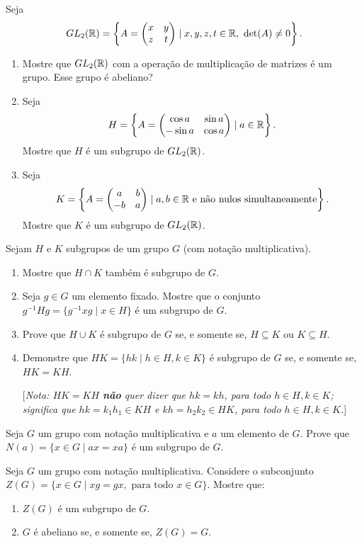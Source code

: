 \documentclass[12pt]{exam}
\begin{document}
    \questao{} Seja
    \[
      GL_2(\mathbb{R}) = \left\{A = \begin{pmatrix}
          x & y\\z & t
      \end{pmatrix} \mid x, y, z, t \in \mathbb{R},\ \det(A) \ne 0\right\}.
    \]
    \begin{enumerate}[label=({\alph*})]
      \item Mostre que $GL_2(\mathbb{R})$ com a opera\c{c}\~ao de multiplica\c{c}\~ao de matrizes \'e um grupo. Esse grupo \'e abeliano?
      \item Seja
      \[
          H = \left\{ A = \begin{pmatrix}
              \cos a & \sin a\\ -\sin a & \cos a
          \end{pmatrix} \mid a \in \mathbb{R}\right\}.
      \]
      Mostre que $H$ \'e um subgrupo de $GL_2(\mathbb{R})$.
      \item Seja
      \[
          K = \left\{ A = \begin{pmatrix}
              a & b\\ -b & a
          \end{pmatrix} \mid a, b \in \mathbb{R} \mbox{ e n\~ao nulos simultaneamente}\right\}.
      \]
      Mostre que $K$ \'e um subgrupo de $GL_2(\mathbb{R})$.
    \end{enumerate}

    \questao{} Sejam $H$ e $K$ subgrupos de um grupo $G$ (com nota{\c c}{\~a}o
    multiplicativa).
    \begin{enumerate}[label=({\alph*})]
    \item Mostre que $H\cap K$ tamb{\'e}m {\'e} subgrupo de $G$.
    \item Seja $g\in G$ um elemento fixado. Mostre que o conjunto
    $g^{-1}Hg=\{ g^{-1}xg \mid x\in H \} $ {\'e} um subgrupo de $G$.
    \item Prove que $H\cup K$ {\'e} subgrupo de $G$ se, e somente se,
    $H\subseteq K$ ou $K\subseteq H$.
    \item Demonstre que $HK=\{hk \mid h\in H, k\in K\}$ {\'e} subgrupo
    de $G$ se, e somente se, $HK=KH$.

    [\emph{Nota: $HK=KH$ \textbf{n{\~a}o} quer dizer que $hk=kh$,
    para todo $h\in H, k\in K$; significa que $hk=k_1h_1 \in KH$ e $kh=h_2k_2 \in
    HK$, para todo $h\in H, k\in K$.}]
    \end{enumerate}

    \vspace{.3cm}
    \questao{} Seja $G$ um grupo com nota\c{c}\~ao multiplicativa e $a$ um elemento de $G$. Prove que $N(a) = \{x \in G \mid ax = xa\}$ \'e um subgrupo de $G$.

    \vspace{.3cm}

    \questao{} Seja $G$ um grupo com nota\c{c}\~ao multiplicativa. Considere o subconjunto $Z(G) = \{x \in G \mid xg = gx, \mbox{ para todo } x \in G\}$. Mostre que:
    \begin{enumerate}[label=({\alph*})]
      \item $Z(G)$ \'e um subgrupo de $G$.
      \item $G$ \'e abeliano se, e somente se, $Z(G) = G$.
    \end{enumerate}
\end{document}
